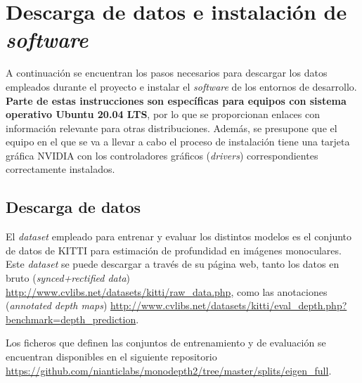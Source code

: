 \pagebreak


\section{Descarga de datos e instalación de \textit{software}}
A continuación se encuentran los pasos necesarios para descargar los datos empleados durante el proyecto e instalar el \textit{software} de los entornos de desarrollo. \textbf{Parte de estas instrucciones son específicas para equipos con sistema operativo Ubuntu 20.04 LTS}, por lo que se proporcionan enlaces con información relevante para otras distribuciones. Además, se presupone que el equipo en el que se va a llevar a cabo el proceso de instalación tiene una tarjeta gráfica NVIDIA con los controladores gráficos (\textit{drivers}) correspondientes correctamente instalados.

\subsection{Descarga de datos}
El \textit{dataset} empleado para entrenar y evaluar los distintos modelos es el conjunto de datos de KITTI para estimación de profundidad en imágenes monoculares. Este \textit{dataset} se puede descargar a través de su página web, tanto los datos en bruto (\textit{synced+rectified data}) \url{http://www.cvlibs.net/datasets/kitti/raw_data.php}, como las anotaciones (\textit{annotated depth maps}) \url{http://www.cvlibs.net/datasets/kitti/eval_depth.php?benchmark=depth_prediction}. 

Los ficheros que definen las conjuntos de entrenamiento y de evaluación se encuentran disponibles en el siguiente repositorio \url{https://github.com/nianticlabs/monodepth2/tree/master/splits/eigen_full}. 

